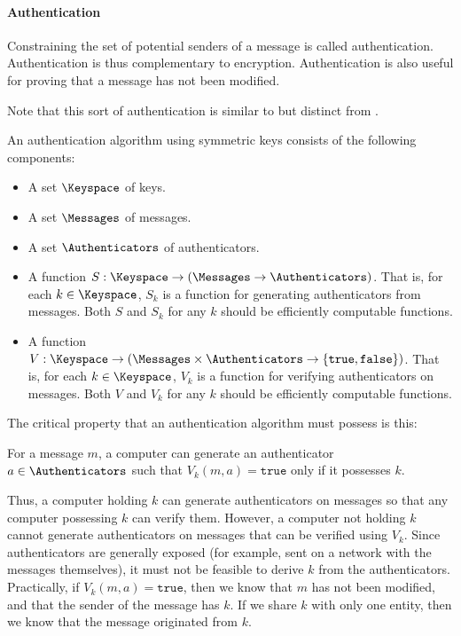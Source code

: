 \paragraph{Authentication}\label{par:Authentication}
Constraining the set of potential senders of a message is called authentication.
Authentication is thus complementary to encryption.
Authentication is also useful for proving that a message has not been modified.

Note that this sort of authentication is similar to but distinct from .

An authentication algorithm using symmetric keys consists of the following components:
\begin{itemize}[noitemsep]
\item A set $\Keyspace$ of keys.
\item A set $\Messages$ of messages.
\item A set $\Authenticators$ of authenticators.
\item A function $S : \Keyspace \rightarrow (\Messages \rightarrow \Authenticators)$.
  That is, for each $k \in \Keyspace$, $S_{k}$ is a function for generating authenticators from messages.
  Both $S$ and $S_{k}$ for any $k$ should be efficiently computable functions.
\item A function $V : \Keyspace \rightarrow (\Messages \times \Authenticators \rightarrow \lbrace \mathtt{true}, \mathtt{false} \rbrace)$.
  That is, for each $k \in \Keyspace$, $V_{k}$ is a function for verifying authenticators on messages.
  Both $V$ and $V_{k}$ for any $k$ should be efficiently computable functions.
\end{itemize}

The critical property that an authentication algorithm must possess is this:
\begin{blackbox}
  For a message $m$, a computer can generate an authenticator $a \in \Authenticators$ such that $V_{k}(m, a) = \mathtt{true}$ only if it possesses $k$.
\end{blackbox}

Thus, a computer holding $k$ can generate authenticators on messages so that any computer possessing $k$ can verify them.
However, a computer not holding $k$ cannot generate authenticators on messages that can be verified using $V_{k}$.
Since authenticators are generally exposed (for example, sent on a network with the messages themselves), it must not be feasible to derive $k$ from the authenticators.
Practically, if $V_{k}(m, a) = \mathtt{true}$, then we know that $m$ has not been modified, and that the sender of the message has $k$.
If we share $k$ with only one entity, then we know that the message originated from $k$.

